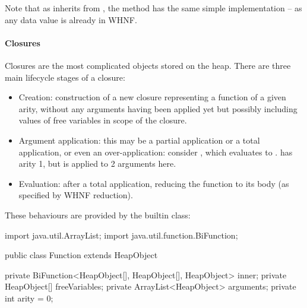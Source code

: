 \documentclass[dissertation.tex]{subfiles}
\begin{document}
{{{{                Note that as  inherits from , the  method has the same simple
                implementation -- as any data value is already in WHNF.

            }
            \paragraph*{Closures}\label{sec:closures}
            {

                Closures are the most complicated objects stored on the heap. There are three main lifecycle stages of a
                closure:

                \begin{itemize}
                \item
                {
                    Creation: construction of a new closure representing a function of a given arity, without any
                    arguments having been applied yet but possibly including values of free variables in scope of the
                    closure.
                }
                \item
                {
                    
                    Argument application: this may be a partial application or a total application, or even an
                    over-application: consider , which evaluates to .  has
                    arity 1, but is applied to 2 arguments here.

                }
                \item
                {
                    Evaluation: after a total application, reducing the function to its body (as specified by WHNF
                    reduction).
                }
                \end{itemize}

                These behaviours are provided by the  builtin class:

                \begin{javafigure}
                import java.util.ArrayList;
                import java.util.function.BiFunction;
                                
                public class Function extends HeapObject {
                    private BiFunction<HeapObject[], HeapObject[], HeapObject> inner;
                    private HeapObject[] freeVariables;
                    private ArrayList<HeapObject> arguments;
                    private int arity = 0;
                                
}
\end{javafigure}}}}}
\end{document}
